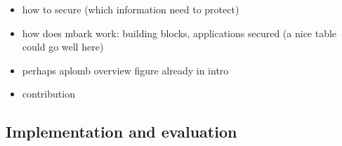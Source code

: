 \begin{itemize}

\item how to secure (which information need to protect)
\item how does mbark work: building blocks, applications secured (a nice table could go well here)
\item perhaps aplomb overview figure already in intro
\item contribution
\end{itemize}

\subsection{Implementation and evaluation}

